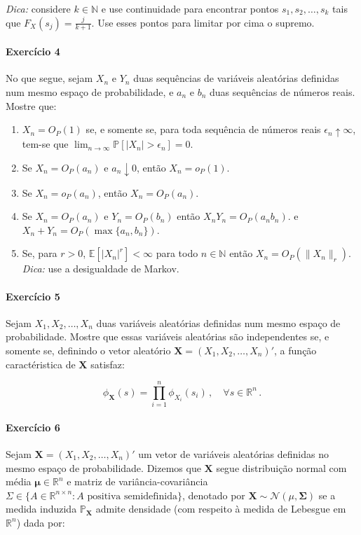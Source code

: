\documentclass[10pt,a4paper]{article}
\begin{document}
 \noindent \textit{Dica:} considere $k \in \mathbb{N}$ e use continuidade para encontrar pontos $s_1,s_2,\ldots,s_{k}$ tais que $F_{X}(s_j) =\frac{j}{k+1}$. Use esses pontos para limitar por cima o supremo.
 
  \paragraph{Exercício 4} No que segue, sejam $X_n$ e $Y_n$ duas sequências de variáveis aleatórias definidas num mesmo espaço de probabilidade, e $a_n$ e $b_n$ duas sequências de números reais. Mostre que:
  \begin{enumerate}
  	\item $X_n = O_P(1)$ se, e somente se, para toda sequência de números reais $\epsilon_n \uparrow \infty$, tem-se que $\lim_{n \to \infty} \mathbb{P}[|X_n|>\epsilon_n ] = 0$.
  	\item Se $X_n = O_P(a_n)$ e $a_n \downarrow 0$, então $X_n = o_P(1)$.
  	  	\item Se $X_n = o_P(a_n)$, então $X_n = O_P(a_n)$.
  	  	  	  	\item Se $X_n = O_P(a_n)$ e $Y_n = O_P(b_n)$  então $X_n Y_n = O_P(a_n b_n)$. e $X_n +Y_n = O_P(\max\{a_n,b_n\})$.
  	  	  	  	\item Se, para $r>0$, $\mathbb{E}[|X_n|^r] < \infty$ para todo $n \in \mathbb{N}$ então $X_n  = O_P(\lVert X_n \rVert_r)$. \textit{Dica:} use a desigualdade de Markov.
  \end{enumerate} 

\paragraph{Exercício 5} Sejam $X_1, X_2, \ldots, X_n$ duas variáveis aleatórias definidas num mesmo espaço de probabilidade. Mostre que essas variáveis aleatórias são independentes se, e somente se, definindo o vetor aleatório $\boldsymbol{X}=(X_1,X_2,\ldots,X_n)'$, a função caractéristica de $\boldsymbol{X}$ satisfaz:

$$\phi_{\boldsymbol{X}}(s)= \prod_{i=1}^n \phi_{X_i}(s_i)\,, \quad \forall s \in \mathbb{R}^n\, .$$

\paragraph{Exercício 6} Sejam $\boldsymbol{X} = (X_1,X_2,\ldots,X_n)'$ um vetor de variáveis aleatórias definidas no mesmo espaço de probabilidade. Dizemos que $\boldsymbol{X}$ segue distribuição normal com média $\boldsymbol{\mu} \in \mathbb{R}^{n}$ e matriz de variância-covariância $\Sigma \in \{A \in \mathbb{R}^{n \times n}: A \text{ positiva semidefinida}\}$, denotado por $\boldsymbol{X}\sim \mathcal{N}(\mathbb{\mu},\boldsymbol{\Sigma})$ se a medida induzida $\mathbb{P}_{\boldsymbol{X}}$ admite densidade (com respeito à medida de Lebesgue em $\mathbb{R}^n$) dada por:
\end{document}
